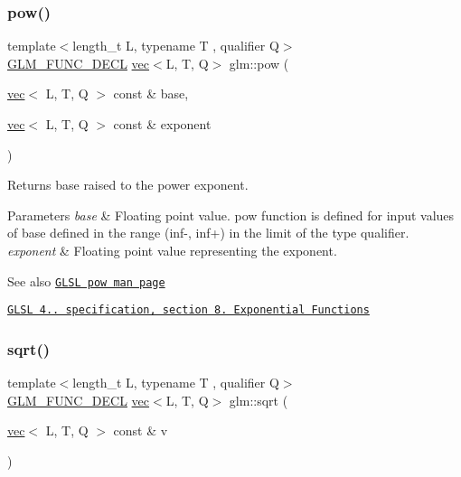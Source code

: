 \subsubsection{\texorpdfstring{pow()}{pow()}}
{\footnotesize\ttfamily template$<$length\+\_\+t L, typename T , qualifier Q$>$ \\
\hyperlink{setup_8hpp_ab2d052de21a70539923e9bcbf6e83a51}{G\+L\+M\+\_\+\+F\+U\+N\+C\+\_\+\+D\+E\+CL} \hyperlink{structglm_1_1vec}{vec}$<$L, T, Q$>$ glm\+::pow (\begin{DoxyParamCaption}\item[{\hyperlink{structglm_1_1vec}{vec}$<$ L, T, Q $>$ const \&}]{base,  }\item[{\hyperlink{structglm_1_1vec}{vec}$<$ L, T, Q $>$ const \&}]{exponent }\end{DoxyParamCaption})}

Returns \textquotesingle{}base\textquotesingle{} raised to the power \textquotesingle{}exponent\textquotesingle{}.


\begin{DoxyParams}{Parameters}
{\em base} & Floating point value. pow function is defined for input values of \textquotesingle{}base\textquotesingle{} defined in the range (inf-\/, inf+) in the limit of the type qualifier. \\
\hline
{\em exponent} & Floating point value representing the \textquotesingle{}exponent\textquotesingle{}.\\
\hline
\end{DoxyParams}
\begin{DoxySeeAlso}{See also}
\href{http://www.opengl.org/sdk/docs/manglsl/xhtml/pow.xml}{\tt G\+L\+SL pow man page} 

\href{http://www.opengl.org/registry/doc/GLSLangSpec.4.20.8.pdf}{\tt G\+L\+SL 4.. specification, section 8. Exponential Functions} 
\end{DoxySeeAlso}
\mbox{\label{group__core__func__exponential_gaa83e5f1648b7ccdf33b87c07c76cb77c}} 
\subsubsection{\texorpdfstring{sqrt()}{sqrt()}}
{\footnotesize\ttfamily template$<$length\+\_\+t L, typename T , qualifier Q$>$ \\
\hyperlink{setup_8hpp_ab2d052de21a70539923e9bcbf6e83a51}{G\+L\+M\+\_\+\+F\+U\+N\+C\+\_\+\+D\+E\+CL} \hyperlink{structglm_1_1vec}{vec}$<$L, T, Q$>$ glm\+::sqrt (\begin{DoxyParamCaption}\item[{\hyperlink{structglm_1_1vec}{vec}$<$ L, T, Q $>$ const \&}]{v }\end{DoxyParamCaption})}

